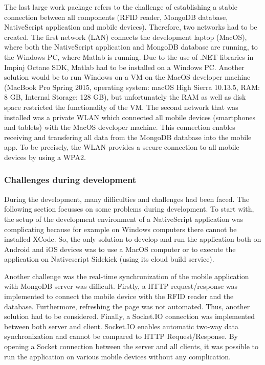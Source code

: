 The last large work package refers to the challenge of establishing a stable connection between all components (RFID reader, MongoDB database, NativeScript application and mobile devices). Therefore, two networks had to be created. The first network (LAN) connects the development laptop (MacOS), where both the NativeScript application and MongoDB database are running, to the Windows PC, where Matlab is running. Due to the use of .NET libraries in Impinj Octane SDK, Matlab had to be installed on a Windows PC. Another solution would be to run Windows on a VM on the MacOS developer machine (MacBook Pro Spring 2015, operating system: macOS High Sierra 10.13.5, RAM: 8 GB, Internal Storage: 128 GB), but unfortunately the RAM as well as disk space restricted the functionality of the VM. The second network that was installed was a private WLAN which connected all mobile devices (smartphones and tablets) with the MacOS developer machine. This connection enables receiving and transfering all data from the MongoDB database into the mobile app. To be precisely, the WLAN provides a secure connection to all mobile devices by using a \ac{WPA2}.

\subsubsection{Challenges during development} \label{challenge}

During the development, many difficulties and challenges had been faced. The following section focusses on some problems during development.
To start with, the setup of the development environment of a NativeScript application was complicating because for example on Windows computers there cannot be installed XCode. So, the only solution to develop and run the application both on Android and iOS devices was to use a MacOS computer or to execute the application on Nativescript Sidekick (using its cloud build service).  

Another challenge was the real-time synchronization of the mobile application with MongoDB server was difficult. Firstly, a HTTP request/response was implemented to connect the mobile device with the RFID reader and the database. Furthermore, refreshing the page was not automated. Thus, another solution had to be considered. Finally, a Socket.IO connection was implemented between both server and client. Socket.IO enables automatic two-way data synchronization and cannot be compared to HTTP Request/Response. By opening a Socket connection between the server and all clients, it was possible to run the application on various mobile devices without any complication. 

